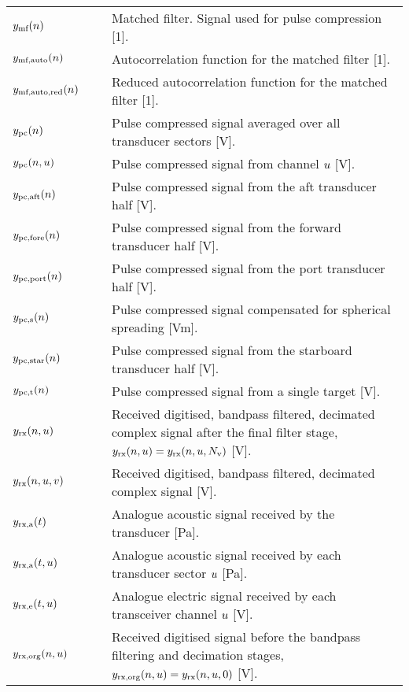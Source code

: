 \documentclass[preprint,12pt,TurnOnLineNumbers]{JASAnew}
\begin{document}
\begin{longtable}{p{0.25\linewidth} p{0.75\linewidth}}
$y_{\textrm{mf}}(n)$ & Matched filter. Signal used for pulse compression [1].\\
$y_{\textrm{mf,auto}}(n)$ & Autocorrelation function for the matched filter [1].\\
$y_{\textrm{mf,auto,red}}(n)$ & Reduced autocorrelation function for the matched filter [1].\\

$y_{\textrm{pc}}(n)$ & Pulse compressed signal averaged over all transducer sectors [V].\\
$y_{\textrm{pc}}(n, u) $ & Pulse compressed signal from channel $u$ [V].\\
$y_{\textrm{pc,aft}}(n)$ & Pulse compressed signal from the aft transducer half [V].\\
$y_{\textrm{pc,fore}}(n)$ & Pulse compressed signal from the forward transducer half [V].\\
$y_{\textrm{pc,port}}(n)$ & Pulse compressed signal from the port transducer half [V].\\
$y_{\textrm{pc,s}}(n)$ & Pulse compressed signal compensated for spherical spreading [Vm].\\
$y_{\textrm{pc,star}}(n)$ & Pulse compressed signal from the starboard transducer half [V].\\
$y_{\textrm{pc,t}}(n)$ & Pulse compressed signal from a single target [V].\\

$y_{\textrm{rx}}(n,u)$ & Received digitised, bandpass filtered, decimated complex signal after the final filter stage, $y_{\textrm{rx}}(n,u) = y_{\textrm{rx}}(n,u,N_{\textrm{v}})$ [V].\\
$y_{\textrm{rx}}(n,u,v)$ & Received digitised, bandpass filtered, decimated complex signal [V].\\
$y_{\textrm{rx,a}}(t)$ & Analogue acoustic signal received by the transducer [Pa].\\
$y_{\textrm{rx,a}}(t,u)$ & Analogue acoustic signal received by each transducer sector $u$ [Pa].\\
$y_{\textrm{rx,e}}(t,u)$ & Analogue electric signal received by each transceiver channel $u$ [V].\\

$y_{\textrm{rx,org}}(n,u)$ & Received digitised signal before the bandpass filtering and decimation stages, $y_{\textrm{rx,org}}(n,u) = y_{\textrm{rx}}(n,u,0)$ [V].\\


\end{longtable}
\end{document}

